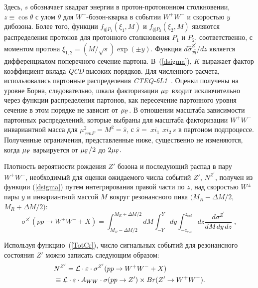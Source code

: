Здесь, $s$ обозначает квадрат энергии в протон-протононном столкновении,
$z\equiv\cos\theta$ с улом $\theta$ для $W^-$-бозон-кварка в событии $W^+W^-$ и скоростью $y$ дибозона. Более того, функции $f_{q|P_1}(\xi_{1},M)$ и $f_{\bar
	q|P_2}(\xi_{2},M)$ являются распределения протонов для
протонного столкновения $P_1$ и $P_2$, соответственно, с моментом протона $\xi_{1,2}=(M/\sqrt
s)\exp(\pm y)$. Функция ${d\hat
	\sigma_{q \bar q}^{Z^\prime}}/{dz}$ является дифференциалом
поперечного сечение партона. В~(\ref{dsigma}), $K$ выражает фактор коэффициент вклада \textit{QCD} высоких порядков.
Для численного расчета, использовались партонные распределения \textit{CTEQ-6L1}~\cite{2part-pankov}. Оценки получены на уровне Борна,
следовательно, шкала факторизации $ \mu_{\rm F} $ входит исключительно через
функции распределения партонов, как пересечение партонного уровня
сечение в этом порядке не зависит от $ \mu_{\rm F} $. В отношении
масштаба зависимости партонных распределений, которые выбраны для
масштаба факторизации $ W ^ + W ^ - $ инвариантной масса для $ \mu _ {\ rm
	F} ^ 2 = M ^ 2 = \hat {s} $, с $ \hat {s} = \ xi_1 \, \ xi_2 \, s $ в партоном
подпроцессе. Полученные ограничения, представленные ниже, существенно не изменяются, когда
$ \mu _ {\rm F} $ варьируется от $ \mu _ {\rm F} / 2 $ до $ 2 \mu _ {\rm F}. $

Плотность вероятности рождения $ Z '$ бозона и
последующий распад в пару $ W ^ + W ^ - $, необходимый для оценки
ожидаемого числа событий $ Z '$, $ N ^ {Z ^ \prime} $, получен
из функции (\ref{dsigma}) путем интегрирования правой части по $ z $,
над скоростью $ W ^ \pm $ пары $ y $ и инвариантной массой $ M $
вокруг резонансного пика $ (M_R- \Delta M / 2, $ $ M_R + \Delta M / 2) $:
\begin{equation}
\sigma^{Z^\prime}{(pp\to W^+W^- + X)}  =\int_{M_{R}-\Delta
	M/2}^{M_{R}+\Delta M/2}d M \int_{-Y}^{Y}d y
\int_{-z_{cut}}^{z_{cut}}d
z\frac{d\sigma^{Z^\prime}}{d M\, d y\, d z}\;, \label{TotCr}
\end{equation}

Используя функцию~(\ref{TotCr}), число сигнальных событий для резонансного состояния $ Z '$ можно записать следующим образом:
\begin{align}
&N^{Z^\prime}= {\cal L}\cdot\varepsilon\cdot
\sigma^{Z^\prime}{(pp\to W^+W^- + X)}\nonumber \\ &\equiv {\cal
	L}\cdot\varepsilon\cdot A_{WW}\cdot \sigma(pp\to Z') \times {Br}(Z' \to W^+W^-).
\label{signal}
\end{align}

